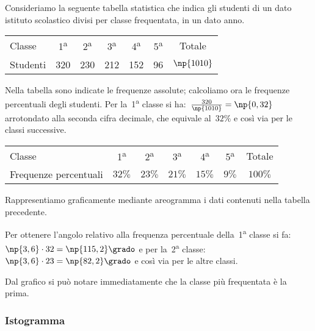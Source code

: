 \begin{exrig}
 \begin{esempio}
Consideriamo la seguente tabella statistica che indica gli studenti di un dato istituto scolastico divisi per classe frequentata, in un dato anno.

\begin{center}
\begin{tabular}{lcccccc}
\toprule
Classe & 1\textsuperscript{a} &2\textsuperscript{a} &3\textsuperscript{a} & 4\textsuperscript{a} &5\textsuperscript{a} &Totale\\
Studenti & 320 & 230 & 212 & 152 & 96 & $\np{1010}$ \\
\bottomrule
\end{tabular}
\end{center}

Nella tabella sono indicate le frequenze assolute; calcoliamo ora le frequenze percentuali degli studenti.
Per la~1\textsuperscript{a} classe si ha:~$\frac{320}{\np{1010}}=\np{0,32}$ arrotondato alla seconda cifra decimale, che equivale al~$32\%$ e così via per le classi successive.

\begin{center}
\begin{tabular}{lcccccc}
\toprule
Classe & 1\textsuperscript{a} & 2\textsuperscript{a} & 3\textsuperscript{a} & 4\textsuperscript{a} & 5\textsuperscript{a} & Totale \\
 Frequenze percentuali& $32\%$ & $23\%$ & $21\%$ & $15\%$ & $9\%$ & $100\%$ \\
\bottomrule
\end{tabular}
\end{center}

Rappresentiamo graficamente mediante areogramma i dati contenuti nella tabella precedente.
\begin{center}
 
\end{center}

Per ottenere l'angolo relativo alla frequenza percentuale della~1\textsuperscript{a} classe si fa:~$\np{3,6} \cdot 32=\np{115,2}\grado$ e
per la~2\textsuperscript{a} classe:~$\np{3,6} \cdot 23=\np{82,2}\grado$ e così via per le altre classi.

Dal grafico si può notare immediatamente che la classe più frequentata è la prima.

 \end{esempio}
\end{exrig}

\subsubsection{Istogramma}

